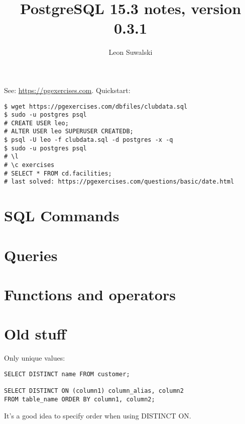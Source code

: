 \documentclass{charun}
\title{PostgreSQL 15.3 notes, version 0.3.1}
\author{Leon Suwalski}
\begin{document}
\begin{multicols*}{2}
\maketitle
\raggedright

See: \url{https://pgexercises.com}.
Quickstart:
\begin{verbatim}
$ wget https://pgexercises.com/dbfiles/clubdata.sql
$ sudo -u postgres psql
# CREATE USER leo;
# ALTER USER leo SUPERUSER CREATEDB;
$ psql -U leo -f clubdata.sql -d postgres -x -q
$ sudo -u postgres psql
# \l
# \c exercises
# SELECT * FROM cd.facilities;
# last solved: https://pgexercises.com/questions/basic/date.html
\end{verbatim}

\section{SQL Commands}


\section{Queries}


\section{Functions and operators}








\newpage
\section{Old stuff}
Only unique values:
\begin{verbatim}
SELECT DISTINCT name FROM customer;

SELECT DISTINCT ON (column1) column_alias, column2
FROM table_name ORDER BY column1, column2;
\end{verbatim}

It's a good idea to specify order when using DISTINCT ON.


\end{multicols*}
\end{document}
